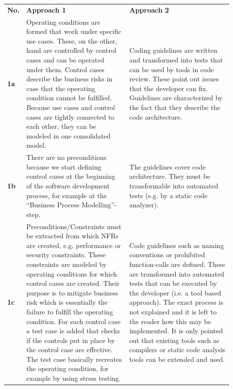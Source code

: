 \begin{longtable}[h]{p{0.02\linewidth}p{0.45\linewidth}p{0.45\linewidth}}
	\centering
	\textbf{No.} & \textbf{Approach 1 \cite{ZouPavlovski2008}} & \textbf{Approach 2 \cite{Lagerstedt2014}} \\
	\textbf{1a} & 
	Operating conditions are formed that work under specific use cases.
	These, on the other, hand are controlled by control cases and can be operated under them.
	Control cases describe the business risks in case that the operating condition cannot be fulfilled.
	Because use cases and control cases are tightly connected to each other, they can be modeled in one consolidated model.
	& 
	
	Coding guidelines are written and transformed into tests that can be used by tools in code review.
	These point out issues that the developer can fix.
	Guidelines are characterized by the fact that they describe the code architecture.
	\\
	
	\textbf{1b} & 
	There are no preconditions because we start defining control cases at the beginning of the software development process, for example at the \enquote{Business Process Modelling}-step.
	
	&
	The guidelines cover code architecture. They must be transformable into automated tests (e.g. by a static code analyzer).
	
	\\
	
	\textbf{1c} &
	Preconditions/Constraints must be extracted from which \glspl{NFR} are created, e.g. performance or security constraints.
	These constraints are modeled by operating conditions for which control cases are created.
	Their purpose is to mitigate business risk which is essentially the failure to fulfill the operating condition.
	For each control case a test case is added that checks if the controls put in place by the control case are effective.
	The test case basically recreates the operating condition, for example by using stress testing.
	
	&
	Code guidelines such as naming conventions or prohibited function-calls are defined.
	These are transformed into automated tests that can be executed by the developer (i.e. a tool based approach).
	The exact process is not explained and it is left to the reader how this may be implemented.
	It is only pointed out that existing tools such as compilers or static code analysis tools can be extended and used.
	\\
	

\end{longtable}
